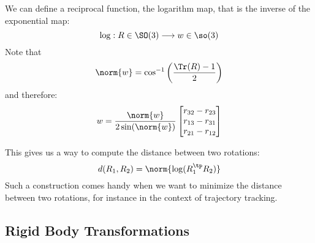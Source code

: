 We can define a reciprocal function, the logarithm map, that is the inverse of the exponential map:
\begin{equation*}
    \log:R\in\SO(3)\longrightarrow w\in\so(3)
\end{equation*}
Note that
\begin{equation*}
    \norm{w}=\cos^{-1}\left(\frac{\Tr(R)-1}{2}\right)
\end{equation*}
and therefore:
\begin{equation*}
    w=\frac{\norm{w}}{2\sin(\norm{w})}\begin{bmatrix}
        r_{32}-r_{23} \\
        r_{13}-r_{31} \\
        r_{21}-r_{12}
    \end{bmatrix}
\end{equation*}

This gives us a way to compute the distance between two rotations:
\begin{equation*}
    d(R_1, R_2) = \norm{\log(R_1^\tp R_2)}
\end{equation*}
Such a construction comes handy when we want to minimize the distance between two rotations, for instance in the context of trajectory tracking.


\subsection{Rigid Body Transformations}
